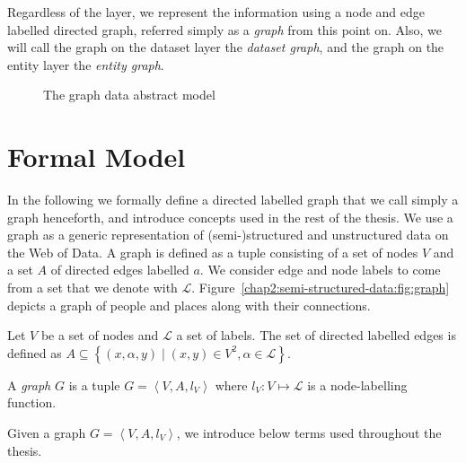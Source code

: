 Regardless of the layer, we represent the information using a node and edge labelled directed graph, referred simply as a \emph{graph} from this point on. Also, we will call the graph on the dataset layer the \emph{dataset graph}, and the graph on the entity layer the \emph{entity graph}.

\begin{figure}
	\centering
	\resizebox{.8\textwidth}{!}{
		
	}
	\caption{The graph data abstract model}
	\label{chap2:semi-structured-data:fig:gdm}
\end{figure}

\section{Formal Model}
\label{chap2:semi-structured-data:gdm:formal-model}

In the following we formally define a directed labelled graph that we call simply a graph henceforth, and introduce concepts used in the rest of the thesis. We use a graph as a generic representation of (semi-)structured and unstructured data on the Web of Data. A graph is defined as a tuple consisting of a set of nodes $V$ and a set $A$ of directed edges labelled $a$. We consider edge and node labels to come from a set that we denote with $\mathcal{L}$. Figure~\ref{chap2:semi-structured-data:fig:graph} depicts a graph of people and places along with their connections.

\begin{definition}[Graph]
	Let $V$ be a set of nodes and $\mathcal{L}$ a set of labels. The set of directed labelled edges is defined as $A \subseteq \left\lbrace (x, \alpha, y) \mid (x, y) \in V^2, \alpha \in \mathcal{L} \right\rbrace$.

	A \emph{graph} $G$ is a tuple $G = \left\langle V, A, l_V \right\rangle$ where $l_V : V \mapsto \mathcal{L}$ is a node-labelling function.
\end{definition}

Given a graph $G = \left\langle V, A, l_V \right\rangle$, we introduce below terms used throughout the thesis.

